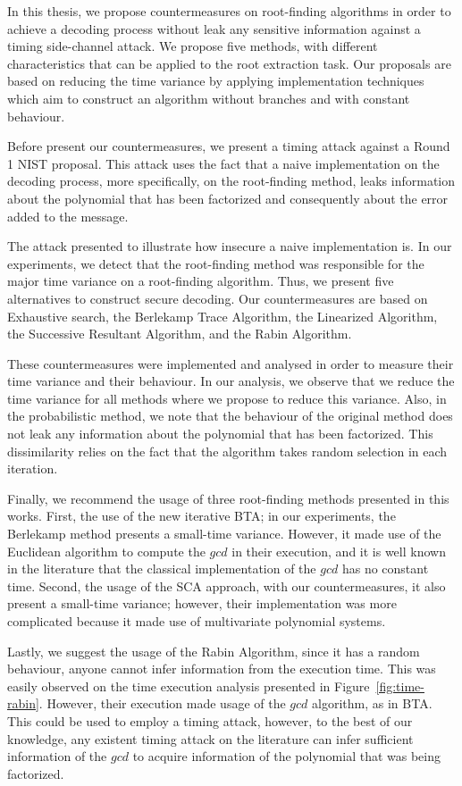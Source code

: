 In this thesis, we propose countermeasures on root-finding algorithms in order to achieve a decoding process without leak any sensitive information against a timing side-channel attack. We propose five methods, with different characteristics that can be applied to the root extraction task. Our proposals are based on reducing the time variance by applying implementation techniques which aim to construct an algorithm without branches and with constant behaviour. 

Before present our countermeasures, we present a timing attack against a Round 1 NIST proposal. This attack uses the fact that a naive implementation on the decoding process, more specifically, on the root-finding method, leaks information about the polynomial that has been factorized and consequently about the error added to the message. 

The attack presented to illustrate how insecure a naive implementation is. In our experiments, we detect that the root-finding method was responsible for the major time variance on a root-finding algorithm. Thus, we present five alternatives to construct secure decoding. Our countermeasures are based on Exhaustive search, the Berlekamp Trace Algorithm, the Linearized Algorithm, the Successive Resultant Algorithm, and the Rabin Algorithm. 

These countermeasures were implemented and analysed in order to measure their time variance and their behaviour. In our analysis, we observe that we reduce the time variance for all methods where we propose to reduce this variance. Also, in the probabilistic method, we note that the behaviour of the original method does not leak any information about the polynomial that has been factorized. This dissimilarity relies on the fact that the algorithm takes random selection in each iteration.

Finally, we recommend the usage of three root-finding methods presented in this works. First, the use of the new iterative BTA; in our experiments, the Berlekamp method presents a small-time variance. However, it made use of the Euclidean algorithm to compute the $gcd$ in their execution, and it is well known in the literature that the classical implementation of the $gcd$ has no constant time. Second, the usage of the SCA approach, with our countermeasures, it also present a small-time variance; however, their implementation was more complicated because it made use of multivariate polynomial systems.

Lastly, we suggest the usage of the Rabin Algorithm, since it has a random behaviour, anyone cannot infer information from the execution time. This was easily observed on the time execution analysis presented in Figure~\ref{fig:time-rabin}. However, their execution made usage of the $gcd$ algorithm, as in BTA. This could be used to employ a timing attack, however, to the best of our knowledge, any existent timing attack on the literature can infer sufficient information of the $gcd$ to acquire information of the polynomial that was being factorized.

